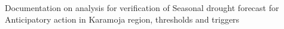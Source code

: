 Documentation on analysis for verification of Seasonal drought forecast for Anticipatory action in Karamoja region, thresholds and triggers 
